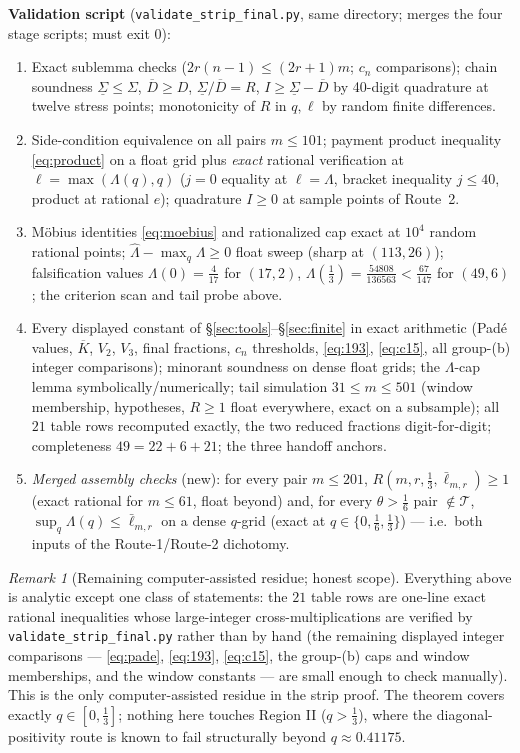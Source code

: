 \documentclass[11pt]{amsart}
\theoremstyle{remark}
\newtheorem{remark}[theorem]{Remark}
\newcommand{\lbar}{\bar\ell}
\newcommand{\Lhat}{\widehat\Lambda}
\begin{document}
\smallskip
\noindent\textbf{Validation script} (\texttt{validate\_strip\_final.py}, same directory; merges the four stage scripts; must exit $0$):
\begin{enumerate}[label=\textup{\arabic*.}]
\item[A1-1/2/3.] Exact sublemma checks ($2r(n-1)\le(2r+1)m$; $c_n$ comparisons); chain soundness $\underline\Sigma\le\Sigma$, $\overline D\ge D$, $\underline\Sigma/\overline D=R$, $I\ge\underline\Sigma-\overline D$ by 40-digit quadrature at twelve stress points; monotonicity of $R$ in $q,\ell$ by random finite differences.
\item[A2-1/2/3.] Side-condition equivalence on all pairs $m\le101$; payment product inequality \eqref{eq:product} on a float grid plus \emph{exact} rational verification at $\ell=\max(\Lambda(q),q)$ ($j=0$ equality at $\ell=\Lambda$, bracket inequality $j\le40$, product at rational $e$); quadrature $I\ge0$ at sample points of Route~2.
\item[B1-1/2/3/4.] M\"obius identities \eqref{eq:moebius} and rationalized cap exact at $10^4$ random rational points; $\Lhat-\max_q\Lambda\ge0$ float sweep (sharp at $(113,26)$); falsification values $\Lambda(0)=\tfrac4{17}$ for $(17,2)$, $\Lambda(\tfrac13)=\tfrac{54808}{136563}<\tfrac{67}{147}$ for $(49,6)$; the criterion scan and tail probe above.
\item[B2-1\dots7.] Every displayed constant of \S\ref{sec:tools}--\S\ref{sec:finite} in exact arithmetic (Pad\'e values, $\overline K$, $V_2$, $V_3$, final fractions, $c_n$ thresholds, \eqref{eq:193}, \eqref{eq:c15}, all group-(b) integer comparisons); minorant soundness on dense float grids; the $\Lambda$-cap lemma symbolically/numerically; tail simulation $31\le m\le501$ (window membership, hypotheses, $R\ge1$ float everywhere, exact on a subsample); all $21$ table rows recomputed exactly, the two reduced fractions digit-for-digit; completeness $49=22+6+21$; the three handoff anchors.
\item[M-1/2.] \emph{Merged assembly checks} (new): for every pair $m\le201$, $R(m,r,\tfrac13,\lbar_{m,r})\ge1$ (exact rational for $m\le61$, float beyond) and, for every $\theta>\tfrac16$ pair $\notin\mathcal T$, $\sup_q\Lambda(q)\le\lbar_{m,r}$ on a dense $q$-grid (exact at $q\in\{0,\tfrac16,\tfrac13\}$) --- i.e.\ both inputs of the Route-1/Route-2 dichotomy.
\end{enumerate}

\begin{remark}[Remaining computer-assisted residue; honest scope]\label{rmk:residue}
Everything above is analytic except one class of statements: the $21$ table rows are one-line exact rational inequalities whose large-integer cross-multiplications are verified by \texttt{validate\_strip\_final.py} rather than by hand (the remaining displayed integer comparisons --- \eqref{eq:pade}, \eqref{eq:193}, \eqref{eq:c15}, the group-(b) caps and window memberships, and the window constants --- are small enough to check manually).  This is the only computer-assisted residue in the strip proof.  The theorem covers exactly $q\in[0,\tfrac13]$; nothing here touches Region II ($q>\tfrac13$), where the diagonal-positivity route is known to fail structurally beyond $q\approx0.41175$.
\end{remark}
\end{document}
